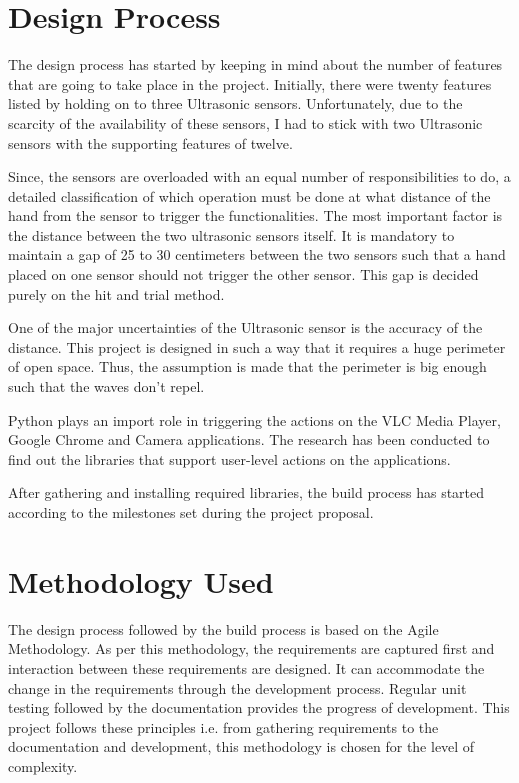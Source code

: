 \documentclass[12pt,journal]{IEEEtran}
\begin{document}
\section{Design Process}
The design process has started by keeping in mind about the number of features that are going to take place in the project. Initially, there were twenty features listed by holding on to three Ultrasonic sensors. Unfortunately, due to the scarcity of the availability of these sensors, I had to stick with two Ultrasonic sensors with the supporting features of twelve.
\par Since, the sensors are overloaded with an equal number of responsibilities to do, a detailed classification of which operation must be done at what distance of the hand from the sensor to trigger the functionalities. The most important factor is the distance between the two ultrasonic sensors itself. It is mandatory to maintain a gap of 25 to 30 centimeters between the two sensors such that a hand placed on one sensor should not trigger the other sensor. This gap is decided purely on the hit and trial method.
\par
One of the major uncertainties of the Ultrasonic sensor is the accuracy of the distance. This project is designed in such a way that it requires a huge perimeter of open space. Thus, the assumption is made that the perimeter is big enough such that the waves don’t repel.
\par Python plays an import role in triggering the actions on the VLC Media Player, Google Chrome and Camera applications. The research has been conducted to find out the libraries that support user-level actions on the applications.
\par After gathering and installing required libraries, the build process has started according to the milestones set during the project proposal.

\section{Methodology Used}
The design process followed by the build process is based on the Agile Methodology. As per this methodology, the requirements are captured first and interaction between these requirements are designed. It can accommodate the change in the requirements through the development process. Regular unit testing followed by the documentation provides the progress of development. This project follows these principles i.e. from gathering requirements to the documentation and development, this methodology is chosen for the level of complexity.
\end{document}
